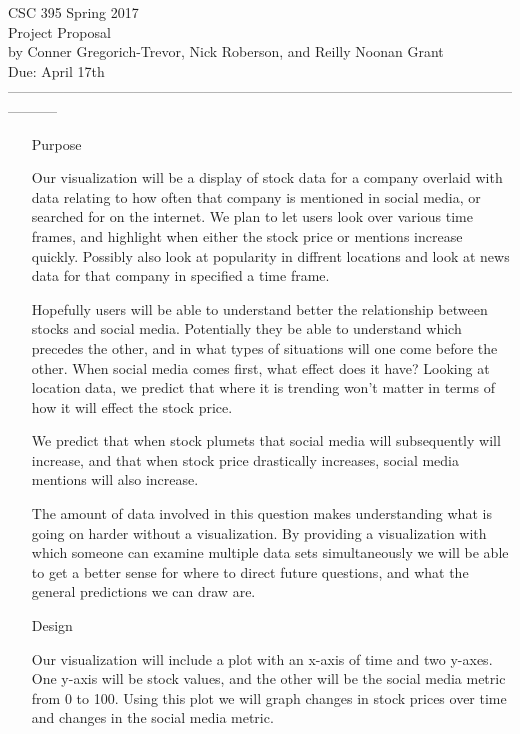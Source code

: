 \documentclass[12pt]{article}
\begin{document}
\begin{center} 
  CSC 395 Spring 2017 \\
  Project Proposal\\
  by Conner Gregorich-Trevor, Nick Roberson, and Reilly Noonan Grant\\
  Due: April 17th \\

----------------------------------------------------------------------------------------------------------------------- \end{center}

\begin{enumerate}
  \item[Purpose] 

    Our visualization will be a display of stock data for a company
    overlaid with data relating to how often that company is mentioned
    in social media, or searched for on the internet. We plan to let
    users look over various time frames, and highlight when either the
    stock price or mentions increase quickly. Possibly also look at
    popularity in diffrent locations and look at news data for that
    company in specified a time frame. 
    
    Hopefully users will be able to understand better the relationship between
    stocks and social media.
    Potentially they be able to understand which precedes the
    other, and in what types of situations will one come before the
    other.  When social media comes first, what effect does it have?
    Looking at location data, we predict that where it is trending
    won't matter in terms of how it will effect the stock price.

    We predict that when stock plumets that social
    media will subsequently will increase, and that when stock price
    drastically increases, social media mentions will also
    increase. 

    The amount of data involved in this question makes understanding
    what is going on harder without a visualization. By providing a
    visualization with which someone can examine multiple data sets
    simultaneously we will be able to get a better sense for
    where to direct future questions, and what the general predictions
    we can draw are.
    
  \item[Design]
    
    Our visualization will include a plot with an x-axis of time and
    two y-axes. One y-axis will be stock values, and the other will be
    the social media metric from 0 to 100. Using this plot
    we will graph changes in stock prices over time and changes in the
    social media metric.


\end{enumerate}
\end{document}
